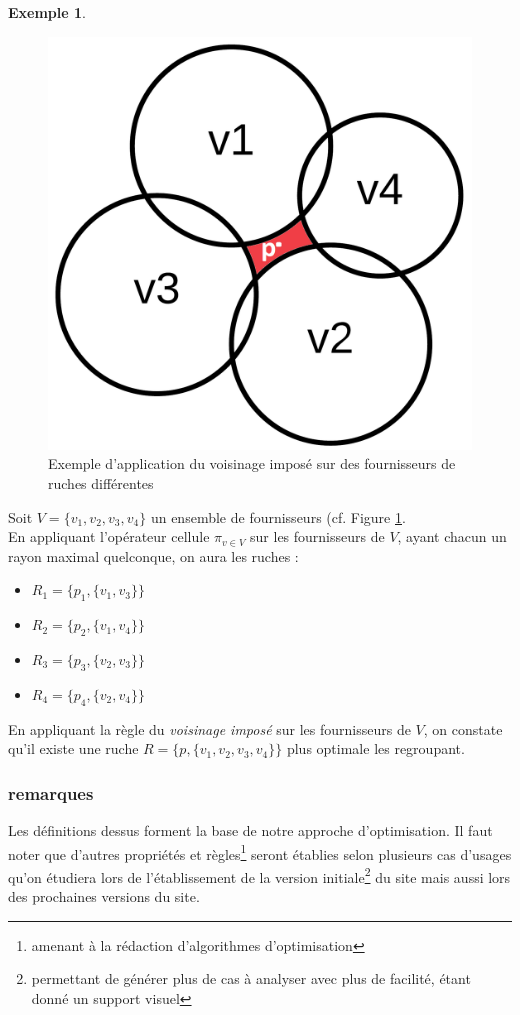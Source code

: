 \documentclass[a4paper,12pt]{book}
\theoremstyle{break}
\theoremstyle{break}
\theoremstyle{break}
\theoremstyle{break}
\theoremstyle{definition}
\newtheorem*{example}{Exemple}
\theoremstyle{remark}
\begin{document}
\begin{example}
\begin{figure}
  \centering
  \includegraphics[scale=0.15]{images/exemple_introductif2.png}
  \caption{Exemple d'application du voisinage imposé sur des fournisseurs de ruches différentes}
  \label{fig:exemple_introductif_2}
\end{figure}

Soit $V = \{v_1, v_2, v_3, v_4\}$ un ensemble de fournisseurs (cf. Figure \ref{fig:exemple_introductif_2}.\\
En appliquant l'opérateur cellule $\pi_{v \in V}$ sur les fournisseurs de $V$, ayant chacun un rayon maximal quelconque, on aura les ruches :
\begin{itemize}
  \item{$R_1 = \{p_1, \{v_1, v_3\}\}$}
  \item{$R_2 = \{p_2, \{v_1, v_4\}\}$}
  \item{$R_3 = \{p_3, \{v_2, v_3\}\}$}
  \item{$R_4 = \{p_4, \{v_2, v_4\}\}$}
\end{itemize}
En appliquant la règle du \textit{voisinage imposé} sur les fournisseurs de $V$, on constate qu'il existe une ruche $R=\{p, \{v_1, v_2, v_3, v_4\}\}$ plus optimale les regroupant.
\end{example}

\subsubsection{remarques}
Les définitions dessus forment la base de notre approche d'optimisation. Il faut noter que d'autres propriétés et règles\footnote{amenant à la rédaction d'algorithmes d'optimisation} seront établies selon plusieurs cas d'usages qu'on étudiera lors de l'établissement de la version initiale\footnote{permettant de générer plus de cas à analyser avec plus de facilité, étant donné un support visuel} du site mais aussi lors des prochaines versions du site.
\end{document}
